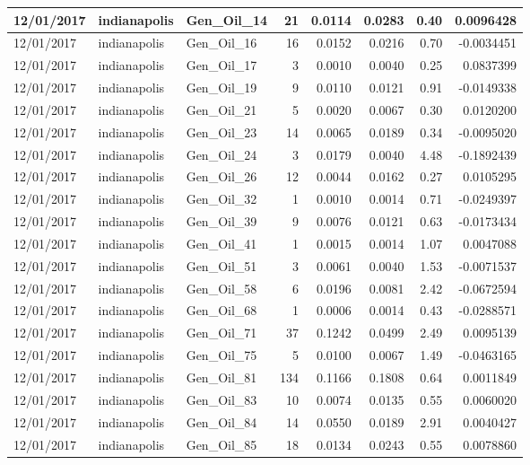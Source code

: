 \documentclass[
  letterpaper,
  DIV=11,
  numbers=noendperiod]{scrartcl}
\begin{document}
\begin{tabular}{l|l|l|r|r|r|r|r}
\hline
12/01/2017 & indianapolis & Gen\_Oil\_14 & 21 & 0.0114 & 0.0283 & 0.40 & 0.0096428\\
\hline
12/01/2017 & indianapolis & Gen\_Oil\_16 & 16 & 0.0152 & 0.0216 & 0.70 & -0.0034451\\
\hline
12/01/2017 & indianapolis & Gen\_Oil\_17 & 3 & 0.0010 & 0.0040 & 0.25 & 0.0837399\\
\hline
12/01/2017 & indianapolis & Gen\_Oil\_19 & 9 & 0.0110 & 0.0121 & 0.91 & -0.0149338\\
\hline
12/01/2017 & indianapolis & Gen\_Oil\_21 & 5 & 0.0020 & 0.0067 & 0.30 & 0.0120200\\
\hline
12/01/2017 & indianapolis & Gen\_Oil\_23 & 14 & 0.0065 & 0.0189 & 0.34 & -0.0095020\\
\hline
12/01/2017 & indianapolis & Gen\_Oil\_24 & 3 & 0.0179 & 0.0040 & 4.48 & -0.1892439\\
\hline
12/01/2017 & indianapolis & Gen\_Oil\_26 & 12 & 0.0044 & 0.0162 & 0.27 & 0.0105295\\
\hline
12/01/2017 & indianapolis & Gen\_Oil\_32 & 1 & 0.0010 & 0.0014 & 0.71 & -0.0249397\\
\hline
12/01/2017 & indianapolis & Gen\_Oil\_39 & 9 & 0.0076 & 0.0121 & 0.63 & -0.0173434\\
\hline
12/01/2017 & indianapolis & Gen\_Oil\_41 & 1 & 0.0015 & 0.0014 & 1.07 & 0.0047088\\
\hline
12/01/2017 & indianapolis & Gen\_Oil\_51 & 3 & 0.0061 & 0.0040 & 1.53 & -0.0071537\\
\hline
12/01/2017 & indianapolis & Gen\_Oil\_58 & 6 & 0.0196 & 0.0081 & 2.42 & -0.0672594\\
\hline
12/01/2017 & indianapolis & Gen\_Oil\_68 & 1 & 0.0006 & 0.0014 & 0.43 & -0.0288571\\
\hline
12/01/2017 & indianapolis & Gen\_Oil\_71 & 37 & 0.1242 & 0.0499 & 2.49 & 0.0095139\\
\hline
12/01/2017 & indianapolis & Gen\_Oil\_75 & 5 & 0.0100 & 0.0067 & 1.49 & -0.0463165\\
\hline
12/01/2017 & indianapolis & Gen\_Oil\_81 & 134 & 0.1166 & 0.1808 & 0.64 & 0.0011849\\
\hline
12/01/2017 & indianapolis & Gen\_Oil\_83 & 10 & 0.0074 & 0.0135 & 0.55 & 0.0060020\\
\hline
12/01/2017 & indianapolis & Gen\_Oil\_84 & 14 & 0.0550 & 0.0189 & 2.91 & 0.0040427\\
\hline
12/01/2017 & indianapolis & Gen\_Oil\_85 & 18 & 0.0134 & 0.0243 & 0.55 & 0.0078860\\

\end{tabular}
\end{document}
